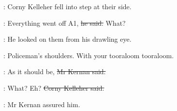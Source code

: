 :
Corny Kelleher fell into step at their side.

\corny:
Everything went off A1,
\sout{he said.}
What?

:
He looked on them from his drawling eye.

\BloomInt:
Policeman's shoulders.
With your tooraloom tooraloom.

:
As it should be,
\sout{Mr Kernan said.}

\corny:
What?
Eh?
\sout{Corny Kelleher said.}

:
Mr Kernan assured him.
